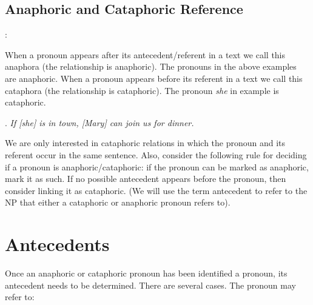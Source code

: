 \documentclass[a4paper]{article}
\begin{document}
\subsection{Anaphoric and Cataphoric Reference}

\cite[p. 4]{GuillouEtAlGuide}:

When a pronoun appears after its antecedent/referent in a text we call this anaphora (the relationship is anaphoric). The pronouns in the above examples are anaphoric. When a pronoun appears before its referent in a text we call this
cataphora (the relationship is cataphoric). The pronoun {\sl she} in example \Next is cataphoric.

\ex.
{\sl If [she] is in town, [Mary] can join us for dinner.}

We are only interested in cataphoric relations in which the pronoun and its referent occur in the same sentence. Also, consider the following rule for deciding if a pronoun is anaphoric/cataphoric: if the pronoun can be marked as anaphoric, mark it as such. If no possible antecedent appears before the pronoun, then consider linking it as cataphoric. (We will use the term antecedent to refer to
the NP that either a cataphoric or anaphoric pronoun refers to).

\section{Antecedents}

Once an anaphoric or cataphoric pronoun has been identified a pronoun, its antecedent needs to be determined. There are several cases. The pronoun may refer to:
\end{document}
